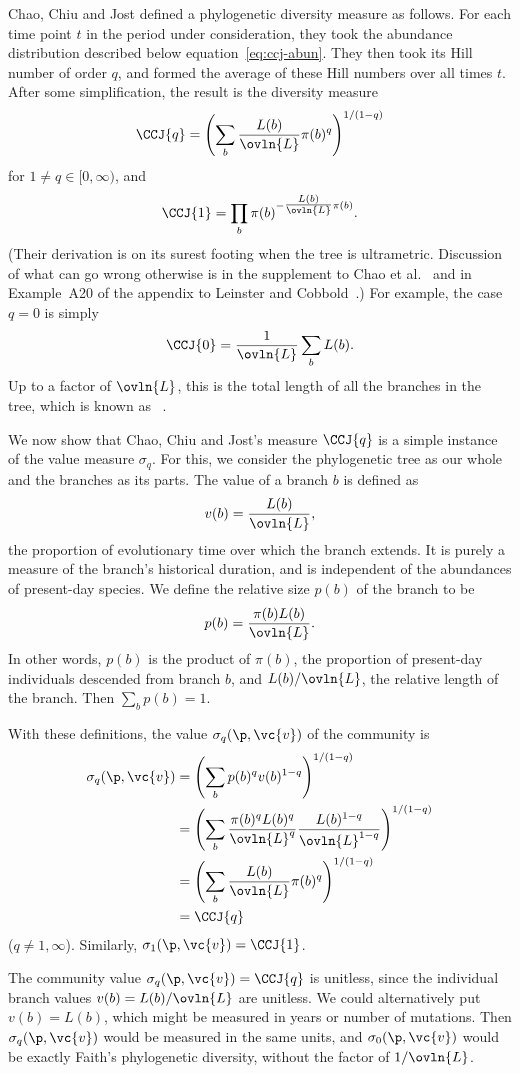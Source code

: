 \begin{example}
Chao, Chiu and Jost defined a phylogenetic diversity measure as follows.
For each time point $t$ in the period under consideration, they took the
abundance distribution described below equation~\eqref{eq:ccj-abun}.  They
then took its Hill number of order $q$, and formed the average of these
Hill numbers over all times $t$.  After some simplification, the result is
the diversity measure
\[
\CCJ{q}
=
\Biggl( \sum_b \frac{L(b)}{\ovln{L}} \pi(b)^q \Biggr)^{1/(1 - q)}
\]
for $1 \neq q \in [0, \infty)$, and 
\[
\CCJ{1}
=
\prod_b \pi(b)^{-{\textstyle\frac{L(b)}{\ovln{L}}} \pi(b)}.
\]
(Their derivation is on its surest footing when the tree is ultrametric.
Discussion of what can go wrong otherwise is in the supplement to
Chao et al.~\cite{CCJ} and in Example~A20 of the appendix to
Leinster and Cobbold~\cite{MDISS}.)  For example, the case $q = 0$ is
simply
\[
\CCJ{0} = \frac{1}{\ovln{L}} \sum_b L(b).
\]
Up to a factor of $\ovln{L}$, this is the total length of all the branches
in the tree, which is known as ~\cite{Fait}.%
%

We now show that Chao, Chiu and Jost's measure $\CCJ{q}$ is a simple
instance of the value measure $\sigma_q$.  For this, we consider the
phylogenetic tree as our whole and the branches as its parts.
The value of a branch $b$ is defined as 
\[
v(b) = \frac{L(b)}{\ovln{L}},
\]
the proportion of evolutionary time over which the branch extends.  It is
purely a measure of the branch's historical duration, and is independent of
the abundances of present-day species.  We define the relative size $p(b)$
of the branch to be
\[
p(b) = \frac{\pi(b) L(b)}{\ovln{L}}.
\]
In other words, $p(b)$ is the product of $\pi(b)$, the proportion of
present-day individuals descended from branch $b$, and $L(b)/\ovln{L}$, the
relative length of the branch.  Then $\sum_b p(b) = 1$.

With these definitions, the value $\sigma_q(\p, \vc{v})$ of the community
is
% 
\begin{align*}
\sigma_q(\p, \vc{v})    &
=
\Biggl( \sum_b p(b)^q v(b)^{1 - q} \Biggr)^{1/(1 - q)}  \\
&
=
\Biggl( 
\sum_b 
\frac{\pi(b)^q L(b)^q}{\ovln{L}^q}
\frac{L(b)^{1 - q}}{\ovln{L}^{1 - q}}
\Biggr)^{1/(1 - q)}     \\
&
=
\Biggl( 
\sum_b 
\frac{L(b)}{\ovln{L}} \pi(b)^q
\Biggr)^{1/(1 - q)}      \\
&
=
\CCJ{q}
\end{align*}
% 
($q \neq 1, \infty$).  Similarly, $\sigma_1(\p, \vc{v}) = \CCJ{1}$.

The community value $\sigma_q(\p, \vc{v}) = \CCJ{q}$ is unitless, since the
individual branch values $v(b) = L(b)/\ovln{L}$ are unitless.  We could
alternatively put $v(b) = L(b)$, which might be measured in years or number
of mutations.  Then $\sigma_q(\p, \vc{v})$ would be measured in the same
units, and $\sigma_0(\p, \vc{v})$ would be exactly Faith's
phylogenetic diversity, without the factor of $1/\ovln{L}$.
\end{example}

